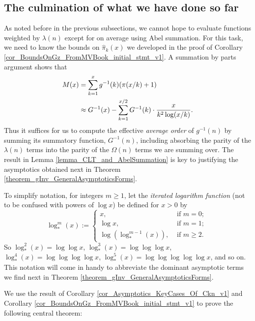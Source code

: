 \documentclass[11pt,reqno,a4letter]{article}
\numberwithin{figure}{section}
\numberwithin{table}{section}
\theoremstyle{plain}
\numberwithin{theorem}{section}
\theoremstyle{definition}
\begin{document}
\subsection{The culmination of what we have done so far} 

As noted before in the previous subsections, we cannot hope to evaluate
functions weighted by $\lambda(n)$ except for on 
average using Abel summation. For this task, 
we need to know the bounds on $\widehat{\pi}_k(x)$ we developed in the 
proof of Corollary \ref{cor_BoundsOnGz_FromMVBook_initial_stmt_v1}. 
A summation by parts argument shows that 
\begin{align} 
\notag
M(x) & = \sum_{k=1}^{x} g^{-1}(k) (\pi(x/k)+1) \\ 
\label{eqn_pf_tag_v2-restated_v2} 
     & \approx G^{-1}(x) - \sum_{k=1}^{x/2} G^{-1}(k) \cdot \frac{x}{k^2 \log(x/k)}. 
\end{align} 
Thus it suffices for us to compute the effective \emph{average order} of $g^{-1}(n)$ 
by summing its summatory function, $G^{-1}(n)$, including absorbing the parity of the 
$\lambda(n)$ terms into the parity of the $\Omega(n)$ terms we are summing over. 
The result in Lemma \ref{lemma_CLT_and_AbelSummation} is key to justifying the 
asymptotics obtained next in Theorem \ref{theorem_gInv_GeneralAsymptoticsForms}. 

To simplify notation, for integers $m \geq 1$, let the \emph{iterated logarithm function} 
(not to be confused with powers of $\log x$) be defined for $x > 0$ by 
\[
\log_{\ast}^{m}(x) := \begin{cases} 
     x, & \text{ if $m = 0$; } \\ 
     \log x, & \text{ if $m = 1$; } \\ 
     \log\left(\log_{\ast}^{m-1}(x)\right), & \text{ if $m \geq 2$. } 
     \end{cases}
\]
So $\log_{\ast}^2(x) = \log\log x$, $\log_{\ast}^3(x) = \log\log\log x$, 
$\log_{\ast}^4(x) = \log\log\log\log x$, $\log_{\ast}^5(x) = \log\log\log\log\log x$, and so on. 
This notation will come in handy to abbreviate the dominant asymptotic terms we find next in 
Theorem \ref{theorem_gInv_GeneralAsymptoticsForms}. 

We use the result of 
Corollary \ref{cor_Asymptotics_KeyCases_Of_Ckn_v1} and 
Corollary \ref{cor_BoundsOnGz_FromMVBook_initial_stmt_v1} 
to prove the following central theorem: 
\end{document}
